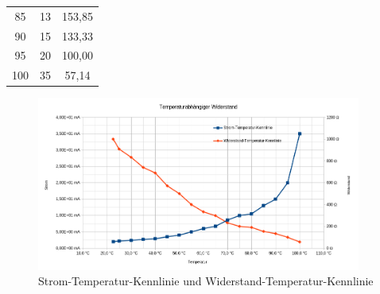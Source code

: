 \begin{enumerate}[label=\alph*)]
\begin{table}[h!]
\begin{center}
\begin{tabular}[c]{c|c|c}
				      85                                                     & 13   & 153,85  \\
				      90                                                     & 15   & 133,33  \\
				      95                                                     & 20   & 100,00  \\
				      100                                                    & 35   & 57,14   \\
				      \hline
			      \end{tabular}
		      \end{center}
	      \end{table}
	      \begin{figure}[h!]
		      \begin{center}
			      \includegraphics[width=0.95\textwidth]{img/4.2.a.1}
		      \end{center}
		      \caption{Strom-Temperatur-Kennlinie und Widerstand-Temperatur-Kennlinie}
	      \end{figure}
	      \pagebreak


\end{enumerate}
